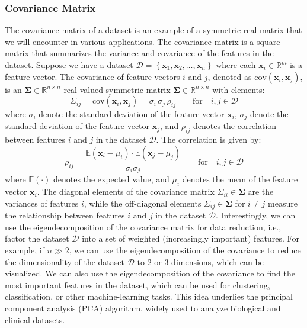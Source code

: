 \documentclass{article}[11pt]
\def\R{\mathbb{R}}
\def\D{\mathcal{D}}
\begin{document}
\subsubsection*{Covariance Matrix}
The covariance matrix of a dataset is an example of a symmetric real matrix that we will encounter in various applications.
The covariance matrix is a square matrix that summarizes the variance and covariance of the features in the dataset.
Suppose we have a dataset $\D = \left\{\mathbf{x}_{1},\mathbf{x}_{2},\dots,\mathbf{x}_{n}\right\}$ where each $\mathbf{x}_{i}\in\mathbb{R}^{m}$ is a feature vector.
The covariance of feature vectors $i$ and $j$, denoted as $\text{cov}\left(\mathbf{x}_{i},\mathbf{x}_{j}\right)$, is an $\mathbf{\Sigma}\in\mathbb{R}^{n\times{n}}$ 
real-valued symmetric matrix $\mathbf{\Sigma}\in\R^{n\times{n}}$ with elements: 
\begin{equation}
    \Sigma_{ij} = \text{cov}\left(\mathbf{x}_{i},\mathbf{x}_{j}\right) = \sigma_{i}\,\sigma_{j}\,\rho_{ij}\qquad\text{for}\quad{i,j \in \mathcal{D}}
\end{equation}
where $\sigma_{i}$ denote the standard deviation of the feature vector $\mathbf{x}_{i}$, $\sigma_{j}$ denote the standard deviation of the 
feature vector $\mathbf{x}_{j}$, and $\rho_{ij}$ denotes the correlation between features $i$ and $j$ in the dataset $\D$. The correlation is given by:
\begin{equation}
\rho_{ij} = \frac{\mathbb{E}(\mathbf{x}_{i}-\mu_{i})\cdot\mathbb{E}(\mathbf{x}_{j} - \mu_{j})}{\sigma_{i}\sigma_{j}}\qquad\text{for}\quad{i,j \in \mathcal{D}}
\end{equation}
where $\mathbb{E}(\cdot)$ denotes the expected value, and $\mu_{i}$ denotes the mean of the feature vector $\mathbf{x}_{i}$.
The diagonal elements of the covariance matrix $\Sigma_{ii}\in\mathbf{\Sigma}$ are the variances of features $i$,
while the off-diagonal elements $\Sigma_{ij}\in\mathbf{\Sigma}$ for $i\neq{j}$ measure the relationship between features 
$i$ and $j$ in the dataset $\mathcal{D}$. Interestingly, we can use the eigendecomposition of the covariance matrix for data reduction, 
i.e., factor the dataset $\D$ into a set of weighted (increasingly important) features. For example, if $n\gg{2}$, 
we can use the eigendecomposition of the covariance to reduce the dimensionality of the dataset $\D$ to $2$ or $3$ dimensions, which can be visualized.
We can also use the eigendecomposition of the covariance to find the most important features in the dataset, which can be used for clustering, classification, or other machine-learning tasks.
This idea underlies the principal component analysis (PCA) algorithm, widely used to analyze biological and clinical datasets.
\end{document}

